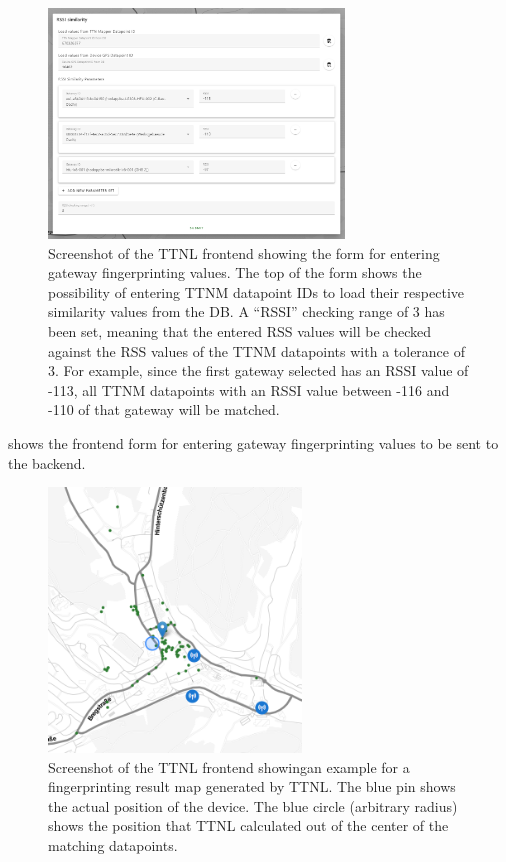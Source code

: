 \begin{figure}[htbp]
    \centering
    \includegraphics[width=0.7\textwidth]{pictures/ttn-locator/frontend/rssi_similarity_form.png}
    \caption{
        Screenshot of the \ac{TTNL} frontend showing the form for entering gateway fingerprinting values.
        The top of the form shows the possibility of entering \ac{TTNM} datapoint IDs to load their respective similarity values from the \ac{DB}.
        A ``RSSI'' checking range of 3 has been set, meaning that the entered \ac{RSS} values will be checked against the \ac{RSS} values of the \ac{TTNM} datapoints with a tolerance of 3.
        For example, since the first gateway selected has an \ac{RSSI} value of -113, all \ac{TTNM} datapoints with an \ac{RSSI} value between -116 and -110 of that gateway will be matched.
    }\label{fig:rssi-similarity-form-frontend}
\end{figure}

 shows the frontend form for entering gateway fingerprinting values to be sent to the backend.

\begin{figure}[htbp]
    \centering
    \includegraphics[width=0.6\textwidth]{pictures/ttn-locator/frontend/fingerprinting/rssi_similarity_map_example.png}
    \caption{
        Screenshot of the \ac{TTNL} frontend showingan example for a fingerprinting result map generated by \ac{TTNL}.
        The blue pin shows the actual position of the device.
        The blue circle (arbitrary radius) shows the position that \ac{TTNL} calculated out of the center of the matching datapoints.
    }\label{fig:fingerprinting-map-example-only-center}
\end{figure}

